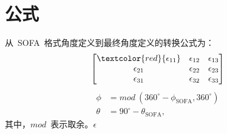 \section{公式}
从~SOFA~格式角度定义到最终角度定义的转换公式为：
\[
\left[
\begin{matrix}
	\textcolor{red}{\epsilon_{11}} & \epsilon_{12} & \epsilon_{13}\\
	\epsilon_{21} & \epsilon_{22} & \epsilon_{23}\\
	\epsilon_{31} & \epsilon_{32} & \epsilon_{33}\\
\end{matrix}\right]
\]
\begin{align}
	\phi & = mod~\left( 360^{\circ}-\phi_{\text{SOFA}}, 360^{\circ} \right) \nonumber \\
	\theta & =  90^{\circ} - \theta_{\text{SOFA}},
\end{align}
其中，$mod$~表示取余。$\epsilon$
